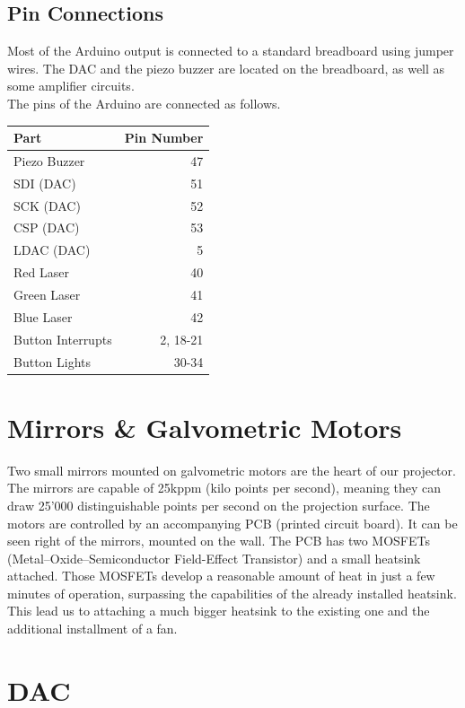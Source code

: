 \documentclass{report}
\begin{document}
\subsection{Pin Connections}

Most of the Arduino output is connected to a standard breadboard using jumper wires. The DAC and the piezo buzzer are located on the breadboard, as well as some amplifier circuits. \\
The pins of the Arduino are connected as follows.

\begin{center}
	\begin{longtable}{l r}
		Part & Pin Number \\
		\hline
		Piezo Buzzer & 47 \\
		SDI (DAC) & 51 \\
		SCK (DAC) & 52 \\
		CSP (DAC) & 53 \\
		LDAC (DAC) & 5 \\
		Red Laser & 40 \\
		Green Laser & 41 \\
		Blue Laser & 42 \\
		Button Interrupts & 2, 18-21 \\
		Button Lights & 30-34 \\
	\end{longtable}
\end{center}

\section{Mirrors \& Galvometric Motors}\label{mirrors}

Two small mirrors mounted on galvometric motors are the heart of our projector. The mirrors are capable of 25kppm (kilo points per second), meaning they can draw 25'000 distinguishable points per second on the projection surface. The motors are controlled by an accompanying PCB (printed circuit board). It can be seen right of the mirrors, mounted on the wall. The PCB has two MOSFETs (Metal–Oxide–Semiconductor Field-Effect Transistor) and a small heatsink attached. Those MOSFETs develop a reasonable amount of heat in just a few minutes of operation, surpassing the capabilities of the already installed heatsink. This lead us to attaching a much bigger heatsink to the existing one and the additional installment of a fan.

\section{DAC}\label{DAC}
\end{document}
